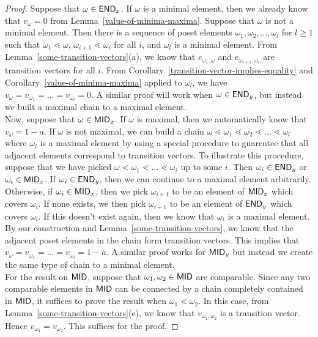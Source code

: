 \documentclass{puthesis-UG}
\begin{document}
\begin{proof}
    Suppose that $\omega \in \mathsf{END}_x$. If $\omega$ is a minimal element, then we already know that $v_\omega = 0$ from Lemma~\ref{value-of-minima-maxima}. Suppose that $\omega$ is not a minimal element. Then there is a sequence of poset elements $\omega_1, \omega_2, \ldots, \omega_l$ for $l \geq 1$ such that $\omega_1 \lessdot \omega$, $\omega_{i+1} \lessdot \omega_i$ for all $i$, and $\omega_l$ is a minimal element. From Lemma~\ref{some-transition-vectors}(a), we know that $e_{\omega_1, \omega}$ and $e_{\omega_{i+1}, \omega_i}$ are transition vectors for all $i$. From Corollary~\ref{transition-vector-implies-equality} and Corollary~\ref{value-of-minima-maxima} applied to $\omega_l$, we have $v_\omega = v_{\omega_1} = \ldots = v_{\omega_l} = 0$. A similar proof will work when $\omega \in \mathsf{END}_y$, but instead we built a maximal chain to a maximal element. \\

    Now, suppose that $\omega \in \mathsf{MID}_x$. If $\omega$ is maximal, then we automatically know that $v_\omega = 1-a$. If $\omega$ is not maximal, we can build a chain $\omega \lessdot \omega_1 \lessdot \omega_2 \lessdot \ldots \lessdot \omega_l$ where $\omega_l$ is a maximal element by using a special procedure to guarentee that all adjacent elements correspond to transition vectors. To illustrate this procedure, suppose that we have picked $\omega \lessdot \omega_1 \lessdot \ldots \lessdot \omega_i$ up to some $i$. Then $\omega_i \in \mathsf{END}_y$ or $\omega_i \in \mathsf{MID}_x$. If $\omega_i \in \mathsf{END}_y$, then we can continue to a maximal element arbitrarily. Otherwise, if $\omega_i \in \mathsf{MID}_x$, then we pick $\omega_{i+1}$ to be an element of $\mathsf{MID}_x$ which covers $\omega_i$. If none exists, we then pick $\omega_{i+1}$ to be an element of $\mathsf{END}_y$ which covers $\omega_i$. If this doesn't exist again, then we know that $\omega_i$ is a maximal element. By our construction and Lemma~\ref{some-transition-vectors}, we know that the adjacent poset elements in the chain form transition vectors. This implies that $v_\omega = v_{\omega_1} = \ldots = v_{\omega_l} = 1-a$. A similar proof works for $\mathsf{MID}_y$ but instead we create the same type of chain to a minimal element. \\

    For the result on $\mathsf{MID}$, suppose that $\omega_1, \omega_2 \in \mathsf{MID}$ are comparable. Since any two comparable elements in $\mathsf{MID}$ can be connected by a chain completely contained in $\mathsf{MID}$, it suffices to prove the result when $\omega_1 \lessdot \omega_2$. In this case, from Lemma~\ref{some-transition-vectors}(e), we know that $v_{\omega_1, \omega_2}$ is a transition vector. Hence $v_{\omega_1} = v_{\omega_2}$. This suffices for the proof.  
\end{proof}
\end{document}
